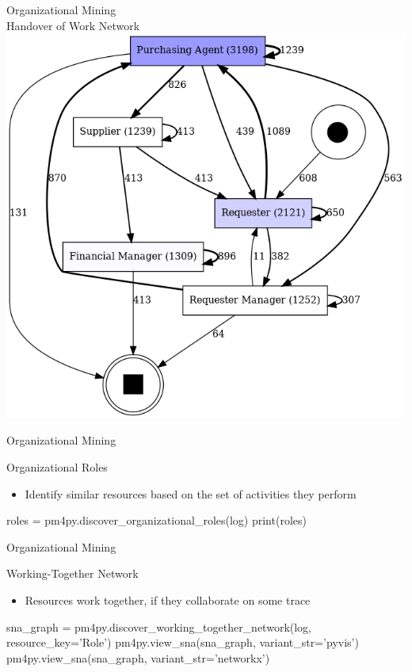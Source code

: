 \documentclass[ignorenonframetext,xcolor=x11names]{beamer}
\begin{document}
\begin{frame}{Organizational Mining\\ \small Handover of Work Network}
\centering
\includegraphics[width=.7\textwidth]{handover.png}
\end{frame}

\begin{frame}[fragile]{Organizational Mining}
\begin{block}{Organizational Roles}
\begin{itemize}
   \item Identify similar resources based on the set of activities they perform
\end{itemize}
\end{block}
\footnotesize
\begin{pythoncode}
roles = pm4py.discover_organizational_roles(log)
print(roles)
\end{pythoncode}
\end{frame}

\begin{frame}[fragile]{Organizational Mining}
\begin{block}{Working-Together Network}
\begin{itemize}
   \item Resources work together, if they collaborate on some trace
\end{itemize}
\end{block}
\footnotesize
\begin{pythoncode}
sna_graph = pm4py.discover_working_together_network(log,
   resource_key='Role')
pm4py.view_sna(sna_graph, variant_str='pyvis')   
pm4py.view_sna(sna_graph, variant_str='networkx')   
\end{pythoncode}
\end{frame}
\end{document}
